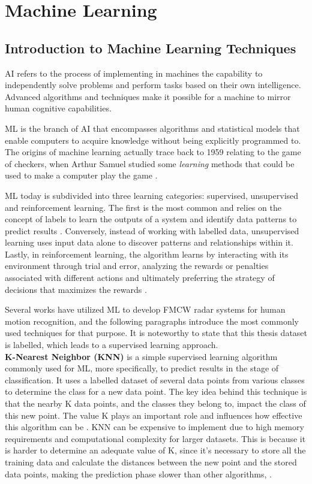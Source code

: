 \section{Machine Learning}
\label{machineLearning}

\subsection{Introduction to Machine Learning Techniques}
\label{sec:machine_learning_techniques}
\gls{AI} refers to the process of implementing in machines the capability to independently solve problems and perform tasks based on their own intelligence. Advanced algorithms and techniques make it possible for a machine to mirror human cognitive capabilities. 

\gls{ML} is the branch of \gls{AI} that encompasses algorithms and statistical models that enable computers to acquire knowledge without being explicitly programmed to. The origins of machine learning actually trace back to 1959 relating to the game of checkers, when Arthur Samuel studied some \textit{learning} methods that could be used to make a computer play the game \cite{ibm_Chess_ML}.

\gls{ML} today is subdivided into three learning categories: supervised, unsupervised and reinforcement learning. The first is the most common and relies on the concept of labels to learn the outputs of a system and identify data patterns to predict results \cite{AI_ML_DL}. Conversely, instead of working with labelled data, unsupervised learning uses input data alone to discover patterns and relationships within it. Lastly, in reinforcement learning, the algorithm learns by interacting with its environment through trial and error, analyzing the rewards or penalties associated with different actions and ultimately preferring the strategy of decisions that maximizes the rewards \cite{AI_ML_DL}.

Several works have utilized \gls{ML} to develop FMCW radar systems for human motion recognition, and the following paragraphs introduce the most commonly used techniques for that purpose. It is noteworthy to state that this thesis dataset is labelled, which leads to a supervised learning approach.\\

\textbf{K-Nearest Neighbor (KNN)} is a simple supervised learning algorithm commonly used for \gls{ML}, more specifically, to predict results in the stage of classification. 
It uses a labelled dataset of several data points from various classes to determine the class for a new data point. The key idea behind this technique is that the nearby K data points, and the classes they belong to, impact the class of this new point. The value K plays an important role and influences how effective this algorithm can be \cite{knn}.
\gls{KNN} can be expensive to implement due to high memory requirements and computational complexity for larger datasets. This is because it is harder to determine an adequate value of K, since it's necessary to store all the training data and calculate the distances between the new point and the stored data points, making the prediction phase slower than other algorithms, \cite{knn}.\\

